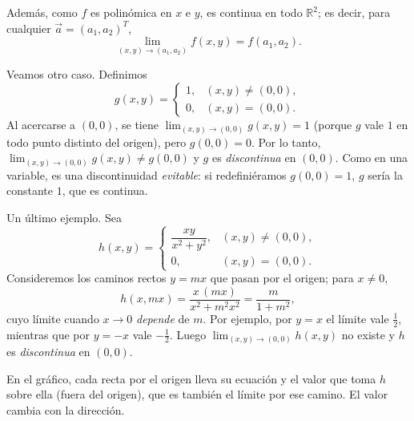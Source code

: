 \documentclass{article}
\newcommand{\vect}[1]{\vec{#1}}
\begin{document}
Además, como \(f\) es polinómica en \(x\) e \(y\), es {\color{teal}continua en todo \(\mathbb{R}^{2}\)}; es decir, para cualquier \(\vect{a}=(a_1,a_2)^T\),
\[
\lim_{(x,y)\to(a_1,a_2)} f(x,y)=f(a_1,a_2).
\]

\medskip
Veamos otro caso. Definimos
\[
g(x,y)=
\begin{cases}
1, & (x,y)\neq(0,0),\\[4pt]
0, & (x,y)=(0,0).
\end{cases}
\]
Al acercarse a \((0,0)\), se tiene
\(\displaystyle \lim_{(x,y)\to(0,0)} g(x,y)=1\)
(porque \(g\) vale \(1\) en todo punto distinto del origen),
pero \(g(0,0)=0\).
{\color{teal}Por lo tanto, \(\displaystyle \lim_{(x,y)\to(0,0)} g(x,y)\neq g(0,0)\) y \(g\) es \emph{discontinua} en \((0,0)\).}
Como en una variable, es una discontinuidad \emph{evitable}: si redefiniéramos \(g(0,0)=1\), \(g\) sería la constante \(1\), que es continua.

\medskip
Un último ejemplo. Sea
\[
h(x,y)=
\begin{cases}
\dfrac{xy}{x^{2}+y^{2}}, & (x,y)\neq(0,0),\\[8pt]
0, & (x,y)=(0,0).
\end{cases}
\]
Consideremos los caminos rectos \(y=mx\) que pasan por el origen; para \(x\neq0\),
\[
h(x,mx)=\frac{x\,(mx)}{x^{2}+m^{2}x^{2}}
= \frac{m}{1+m^{2}},
\]
cuyo límite cuando \(x\to0\) \emph{depende} de \(m\).
{\color{teal}Por ejemplo, por \(y=x\) el límite vale \(\tfrac{1}{2}\), mientras que por \(y=-x\) vale \(-\tfrac{1}{2}\).
Luego \(\displaystyle \lim_{(x,y)\to(0,0)} h(x,y)\) no existe y \(h\) es \emph{discontinua} en \((0,0)\).}

En el gráfico, cada recta por el origen lleva su ecuación y el valor que toma \(h\) sobre ella (fuera del origen), que es también el límite por ese camino. El valor cambia con la dirección.

\begin{center}
\end{center}
\end{document}
